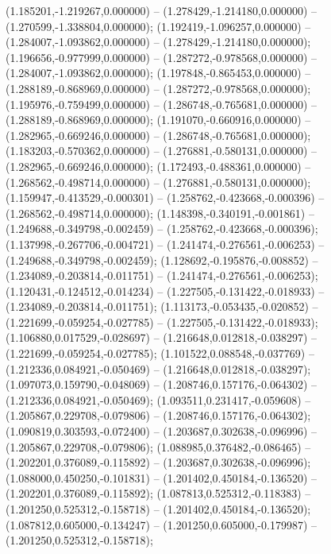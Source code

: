  (1.185201,-1.219267,0.000000) -- (1.278429,-1.214180,0.000000) -- (1.270599,-1.338804,0.000000);
 (1.192419,-1.096257,0.000000) -- (1.284007,-1.093862,0.000000) -- (1.278429,-1.214180,0.000000);
 (1.196656,-0.977999,0.000000) -- (1.287272,-0.978568,0.000000) -- (1.284007,-1.093862,0.000000);
 (1.197848,-0.865453,0.000000) -- (1.288189,-0.868969,0.000000) -- (1.287272,-0.978568,0.000000);
 (1.195976,-0.759499,0.000000) -- (1.286748,-0.765681,0.000000) -- (1.288189,-0.868969,0.000000);
 (1.191070,-0.660916,0.000000) -- (1.282965,-0.669246,0.000000) -- (1.286748,-0.765681,0.000000);
 (1.183203,-0.570362,0.000000) -- (1.276881,-0.580131,0.000000) -- (1.282965,-0.669246,0.000000);
 (1.172493,-0.488361,0.000000) -- (1.268562,-0.498714,0.000000) -- (1.276881,-0.580131,0.000000);
 (1.159947,-0.413529,-0.000301) -- (1.258762,-0.423668,-0.000396) -- (1.268562,-0.498714,0.000000);
 (1.148398,-0.340191,-0.001861) -- (1.249688,-0.349798,-0.002459) -- (1.258762,-0.423668,-0.000396);
 (1.137998,-0.267706,-0.004721) -- (1.241474,-0.276561,-0.006253) -- (1.249688,-0.349798,-0.002459);
 (1.128692,-0.195876,-0.008852) -- (1.234089,-0.203814,-0.011751) -- (1.241474,-0.276561,-0.006253);
 (1.120431,-0.124512,-0.014234) -- (1.227505,-0.131422,-0.018933) -- (1.234089,-0.203814,-0.011751);
 (1.113173,-0.053435,-0.020852) -- (1.221699,-0.059254,-0.027785) -- (1.227505,-0.131422,-0.018933);
 (1.106880,0.017529,-0.028697) -- (1.216648,0.012818,-0.038297) -- (1.221699,-0.059254,-0.027785);
 (1.101522,0.088548,-0.037769) -- (1.212336,0.084921,-0.050469) -- (1.216648,0.012818,-0.038297);
 (1.097073,0.159790,-0.048069) -- (1.208746,0.157176,-0.064302) -- (1.212336,0.084921,-0.050469);
 (1.093511,0.231417,-0.059608) -- (1.205867,0.229708,-0.079806) -- (1.208746,0.157176,-0.064302);
 (1.090819,0.303593,-0.072400) -- (1.203687,0.302638,-0.096996) -- (1.205867,0.229708,-0.079806);
 (1.088985,0.376482,-0.086465) -- (1.202201,0.376089,-0.115892) -- (1.203687,0.302638,-0.096996);
 (1.088000,0.450250,-0.101831) -- (1.201402,0.450184,-0.136520) -- (1.202201,0.376089,-0.115892);
 (1.087813,0.525312,-0.118383) -- (1.201250,0.525312,-0.158718) -- (1.201402,0.450184,-0.136520);
 (1.087812,0.605000,-0.134247) -- (1.201250,0.605000,-0.179987) -- (1.201250,0.525312,-0.158718);
